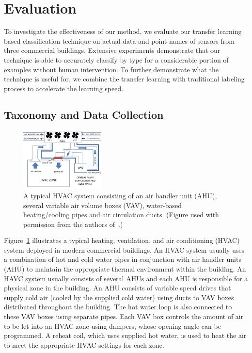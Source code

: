 \section{Evaluation}
To investigate the effectiveness of our method, we evaluate our transfer learning based classification technique on actual data and point names of sensors from three commercial buildings. Extensive experiments demonstrate that our technique is able to accurately classify by type for a considerable portion of examples without human intervention. 
To further demonstrate what the technique is useful for, we combine the transfer learning with traditional labeling process to accelerate the learning speed.

\subsection{Taxonomy and Data Collection}
\begin{figure}[t]
\centering
\includegraphics[width=0.38\textwidth]{./fig/hvac}
\caption{A typical HVAC system consisting of an air handler unit (AHU), several variable air volume boxes (VAV), water-based heating/cooling pipes and air circulation ducts. (Figure used with permission from the authors of~\cite{sentinel}.)}
\label{fig:hvac}
\end{figure}

Figure~\ref{fig:hvac} illustrates a typical heating, ventilation, and air conditioning (HVAC) system deployed in modern commercial buildings. 
An HVAC system usually uses a combination of hot and cold water pipes in conjunction with
air handler units (AHU) to maintain the appropriate thermal environment within the building.
An HAVC system usually consists of several AHUs and each AHU is responsible for a physical zone
in the building. An AHU consists of variable speed drives that supply cold air
(cooled by the supplied cold water) using ducts to VAV boxes distributed throughout the building.
The hot water loop is also connected to these VAV boxes using separate pipes. Each VAV box
controls the amount of air to be let into an HVAC zone using dampers, whose opening angle
can be programmed. A reheat coil, which uses supplied hot water, is used to heat the air to
meet the appropriate HVAC settings for each zone.

